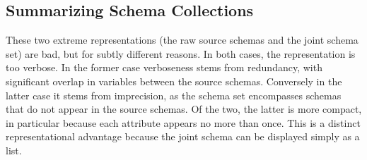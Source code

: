 






\subsection{Summarizing Schema Collections}
These two extreme representations (the raw source schemas and the joint schema set) are bad, but for subtly different reasons.
In both cases, the representation is too verbose.
In the former case verboseness stems from redundancy, with significant overlap in variables between the source schemas.
Conversely in the latter case it stems from imprecision, as the schema set encompasses schemas that do not appear in the source schemas.
Of the two, the latter is more compact, in particular because each attribute appears no more than once.
This is a distinct representational advantage because the joint schema can be displayed simply as a list.

